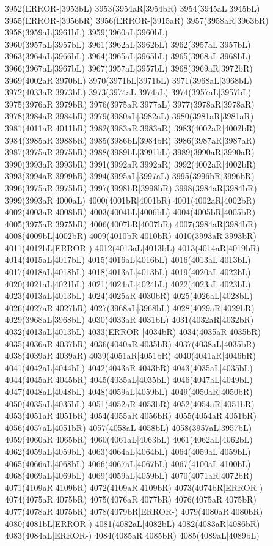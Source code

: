 3952(ERROR-|3953bL) 3953(3954aR|3954bR) 3954(3945aL|3945bL) 3955(ERROR-|3956bR) 3956(ERROR-|3915aR) 3957(3958aR|3963bR) 3958(3959aL|3961bL) 3959(3960aL|3960bL) \\3960(3957aL|3957bL) 3961(3962aL|3962bL) 3962(3957aL|3957bL) 3963(3964aL|3966bL) 3964(3965aL|3965bL) 3965(3968aL|3968bL) 3966(3967aL|3967bL) 3967(3957aL|3957bL) 3968(3969aR|3972bR) \\3969(4002aR|3970bL) 3970(3971bL|3971bL) 3971(3968aL|3968bL) 3972(4033aR|3973bL) 3973(3974aL|3974aL) 3974(3957aL|3957bL) 3975(3976aR|3979bR) 3976(3975aR|3977aL) 3977(3978aR|3978aR) \\3978(3984aR|3984bR) 3979(3980aL|3982aL) 3980(3981aR|3981aR) 3981(4011aR|4011bR) 3982(3983aR|3983aR) 3983(4002aR|4002bR) 3984(3985aR|3988bR) 3985(3986bL|3984bR) 3986(3987aR|3987aR) \\3987(3975aR|3975bR) 3988(3989bL|3991bL) 3989(3990aR|3990aR) 3990(3993aR|3993bR) 3991(3992aR|3992aR) 3992(4002aR|4002bR) 3993(3994aR|3999bR) 3994(3995aL|3997aL) 3995(3996bR|3996bR) \\3996(3975aR|3975bR) 3997(3998bR|3998bR) 3998(3984aR|3984bR) 3999(3993aR|4000aL) 4000(4001bR|4001bR) 4001(4002aR|4002bR) 4002(4003aR|4008bR) 4003(4004bL|4006bL) 4004(4005bR|4005bR) \\4005(3975aR|3975bR) 4006(4007bR|4007bR) 4007(3984aR|3984bR) 4008(4009bL|4002bR) 4009(4010bR|4010bR) 4010(3993aR|3993bR) 4011(4012bL|ERROR-) 4012(4013aL|4013bL) 4013(4014aR|4019bR) \\4014(4015aL|4017bL) 4015(4016aL|4016bL) 4016(4013aL|4013bL) 4017(4018aL|4018bL) 4018(4013aL|4013bL) 4019(4020aL|4022bL) 4020(4021aL|4021bL) 4021(4024aL|4024bL) 4022(4023aL|4023bL) \\4023(4013aL|4013bL) 4024(4025aR|4030bR) 4025(4026aL|4028bL) 4026(4027aR|4027bR) 4027(3968aL|3968bL) 4028(4029aR|4029bR) 4029(3968aL|3968bL) 4030(4033aR|4031bL) 4031(4032aR|4032bR) \\4032(4013aL|4013bL) 4033(ERROR-|4034bR) 4034(4035aR|4035bR) 4035(4036aR|4037bR) 4036(4040aR|4035bR) 4037(4038aL|4035bR) 4038(4039aR|4039aR) 4039(4051aR|4051bR) 4040(4041aR|4046bR) \\4041(4042aL|4044bL) 4042(4043aR|4043bR) 4043(4035aL|4035bL) 4044(4045aR|4045bR) 4045(4035aL|4035bL) 4046(4047aL|4049bL) 4047(4048aL|4048bL) 4048(4059aL|4059bL) 4049(4050aR|4050bR) \\4050(4035aL|4035bL) 4051(4052aR|4053bR) 4052(4054aR|4051bR) 4053(4051aR|4051bR) 4054(4055aR|4056bR) 4055(4054aR|4051bR) 4056(4057aL|4051bR) 4057(4058aL|4058bL) 4058(3957aL|3957bL) \\4059(4060aR|4065bR) 4060(4061aL|4063bL) 4061(4062aL|4062bL) 4062(4059aL|4059bL) 4063(4064aL|4064bL) 4064(4059aL|4059bL) 4065(4066aL|4068bL) 4066(4067aL|4067bL) 4067(4100aL|4100bL) \\4068(4069aL|4069bL) 4069(4059aL|4059bL) 4070(4071aR|4072bR) 4071(4109aR|4109bR) 4072(4109aR|4109bR) 4073(4074bR|ERROR-) 4074(4075aR|4075bR) 4075(4076aR|4077bR) 4076(4075aR|4075bR) \\4077(4078aR|4075bR) 4078(4079bR|ERROR-) 4079(4080aR|4080bR) 4080(4081bL|ERROR-) 4081(4082aL|4082bL) 4082(4083aR|4086bR) 4083(4084aL|ERROR-) 4084(4085aR|4085bR) 4085(4089aL|4089bL) 